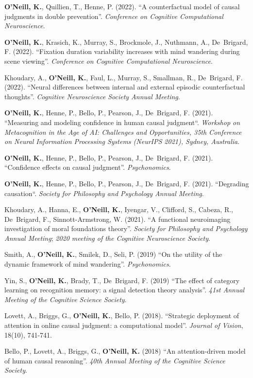\textbf{O'Neill, K.}, Quillien, T., Henne, P. (2022). ``A
counterfactual model of causal judgments in double
prevention''. \emph{Conference on Cognitive Computational
Neuroscience}.

\textbf{O'Neill, K.}, Krasich, K., Murray, S., Brockmole, J.,
Nuthmann, A., De~Brigard, F. (2022). ``Fixation duration variability
increases with mind wandering during scene viewing''. \emph{Conference
on Cognitive Computational Neuroscience}.

Khoudary, A., \textbf{O’Neill, K.}, Faul, L., Murray, S., Smallman,
R., De~Brigard, F. (2022). ``Neural differences between internal and
external episodic counterfactual thoughts''. \emph{Cognitive
Neuroscience Society Annual Meeting}.

\textbf{O'Neill, K.}, Henne, P., Bello, P., Pearson, J., De~Brigard,
F. (2021). ``Measuring and modeling confidence in human causal
judgment``. \emph{Workshop on Metacognition in the Age of AI:
Challenges and Opportunities, 35th Conference on Neural Information
Processing Systems (NeurIPS 2021), Sydney, Australia}.

\textbf{O'Neill, K.}, Henne, P., Bello, P., Pearson, J., De~Brigard,
F. (2021). ``Confidence effects on causal judgment''. \emph{Psychonomics}.

\textbf{O'Neill, K.}, Henne, P., Bello, P., Pearson, J., De~Brigard,
F. (2021). ``Degrading causation``. \emph{Society for Philosophy and
Psychology Annual Meeting}.

Khoudary, A., Hanna, E., \textbf{O’Neill, K.}, Iyengar, V., Clifford,
S., Cabeza, R., De~Brigard, F., Sinnott-Armstrong, W. (2021). ``A
functional neuroimaging investigation of moral foundations
theory''. \emph{Society for Philosophy and Psychology Annual Meeting};
\emph{2020 meeting of the Cognitive Neuroscience Society}.

Smith, A., \textbf{O'Neill, K.}, Smilek, D., Seli, P. (2019) ``On the
utility of the dynamic framework of mind
wandering''. \emph{Psychonomics}.

Yin, S., \textbf{O'Neill, K.}, Brady, T., De~Brigard, F. (2019) ``The
effect of category learning on recognition memory: a signal detection
theory analysis''. \emph{41st Annual Meeting of the Cognitive Science
Society}.

Lovett, A., Briggs, G., \textbf{O'Neill, K.}, Bello,
P. (2018). ``Strategic deployment of attention in online causal
judgment: a computational model''. \emph{Journal of Vision}, 18(10),
741-741.

Bello, P., Lovett, A., Briggs, G., \textbf{O'Neill, K.} (2018) ``An
attention-driven model of human causal reasoning''. \emph{40th Annual
Meeting of the Cognitive Science Society}.
